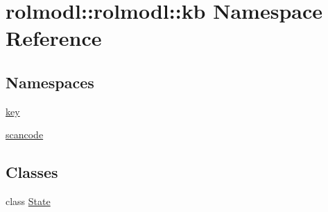 \hypertarget{namespacerolmodl_1_1rolmodl_1_1kb}{}\section{rolmodl\+::rolmodl\+::kb Namespace Reference}
\label{namespacerolmodl_1_1rolmodl_1_1kb}
\subsection*{Namespaces}
\begin{DoxyCompactItemize}
\item 
 \mbox{\hyperlink{namespacerolmodl_1_1rolmodl_1_1kb_1_1key}{key}}
\item 
 \mbox{\hyperlink{namespacerolmodl_1_1rolmodl_1_1kb_1_1scancode}{scancode}}
\end{DoxyCompactItemize}
\subsection*{Classes}
\begin{DoxyCompactItemize}
\item 
class \mbox{\hyperlink{classrolmodl_1_1rolmodl_1_1kb_1_1_state}{State}}
\end{DoxyCompactItemize}
